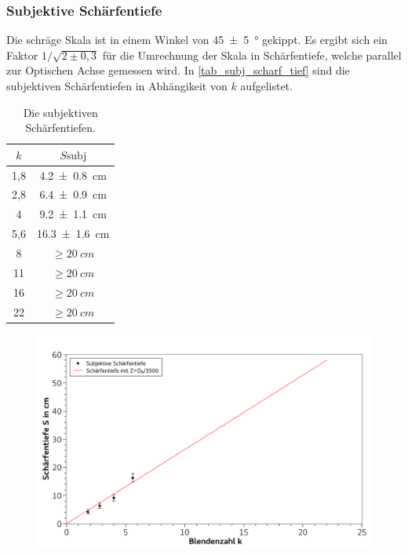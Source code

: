 \documentclass[
	a4paper,
	12pt,
	pagesize,
	ngerman
]{scrartcl}
\begin{document}
	\subsubsection*{Subjektive Schärfentiefe}
	Die schräge Skala ist in einem Winkel von \SI{45+-5}{\degree} gekippt.
	Es ergibt sich ein Faktor $1/\sqrt{2\pm 0,3}$ für die Umrechnung der Skala in Schärfentiefe, welche parallel zur Optischen Achse gemessen wird.
	In \cref{tab_subj_scharf_tief} sind die subjektiven Schärfentiefen in Abhängikeit von $k$ aufgelistet.

	\begin{table}[H]
		\centering
		\begin{tabular}{ c | c }
			$k$ & $S\text{subj}$ \\ \hline
			1,8 & \SI{4,2 +- 0,8}{cm} \\
			2,8 & \SI{6,4 +- 0,9}{cm} \\
			4 & \SI{9,2 +- 1,1}{cm} \\
			5,6 & \SI{16,3 +- 1,6}{cm} \\
			8 & $\geq\SI{20}{cm}$ \\
			11 & $\geq\SI{20}{cm}$ \\
			16 & $\geq\SI{20}{cm}$ \\
			22 & $\geq\SI{20}{cm}$ 
		\end{tabular}
		\caption{Die subjektiven Schärfentiefen. } %
		\label{tab_theo_scharf_tief} 
	\end{table}

	\begin{figure}[H]  %
		\includegraphics[width=1\textwidth]{fig_scharf_tief}
		\centering
		\caption{}
		\label{fig_scharf_tief}
		\centering
	\end{figure}
	
\end{document}
